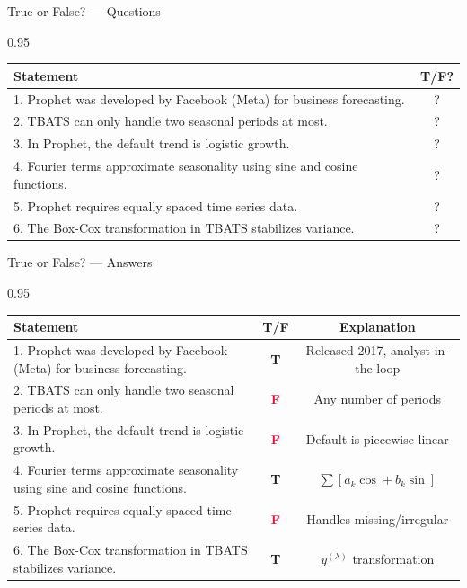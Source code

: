 \documentclass[9pt, aspectratio=169, t]{beamer}
\begin{document}
\begin{frame}{True or False? --- Questions}
    \begin{cminipage}{0.95\textwidth}
    \footnotesize
    \begin{center}
    \begin{tabular}{p{9cm}c}
        \toprule
        \textbf{Statement} & \textbf{T/F?} \\
        \midrule
        1. Prophet was developed by Facebook (Meta) for business forecasting. & ? \\[0.15cm]
        2. TBATS can only handle two seasonal periods at most. & ? \\[0.15cm]
        3. In Prophet, the default trend is logistic growth. & ? \\[0.15cm]
        4. Fourier terms approximate seasonality using sine and cosine functions. & ? \\[0.15cm]
        5. Prophet requires equally spaced time series data. & ? \\[0.15cm]
        6. The Box-Cox transformation in TBATS stabilizes variance. & ? \\
        \bottomrule
    \end{tabular}
    \end{center}
    \end{cminipage}
\end{frame}

\begin{frame}{True or False? --- Answers}
    \begin{cminipage}{0.95\textwidth}
    \scriptsize
    \begin{center}
    \begin{tabular}{p{7.5cm}cc}
        \toprule
        \textbf{Statement} & \textbf{T/F} & \textbf{Explanation} \\
        \midrule
        1. Prophet was developed by Facebook (Meta) for business forecasting. & \textcolor{Forest}{\textbf{T}} & {\tiny Released 2017, analyst-in-the-loop} \\[0.08cm]
        2. TBATS can only handle two seasonal periods at most. & \textcolor{Crimson}{\textbf{F}} & {\tiny Any number of periods} \\[0.08cm]
        3. In Prophet, the default trend is logistic growth. & \textcolor{Crimson}{\textbf{F}} & {\tiny Default is piecewise linear} \\[0.08cm]
        4. Fourier terms approximate seasonality using sine and cosine functions. & \textcolor{Forest}{\textbf{T}} & {\tiny $\sum[a_k\cos + b_k\sin]$} \\[0.08cm]
        5. Prophet requires equally spaced time series data. & \textcolor{Crimson}{\textbf{F}} & {\tiny Handles missing/irregular} \\[0.08cm]
        6. The Box-Cox transformation in TBATS stabilizes variance. & \textcolor{Forest}{\textbf{T}} & {\tiny $y^{(\lambda)}$ transformation} \\
        \bottomrule
    \end{tabular}
    \end{center}
    \end{cminipage}
\end{frame}
\end{document}

